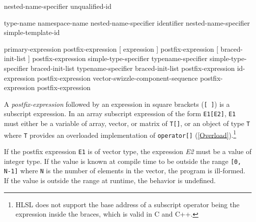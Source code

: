 
\begin{grammar}
  \br
  nested-name-specifier  unqualified-id\br

  \br
  \terminal{::}\br
  type-name \terminal{::}\br
  namespace-name \terminal{::}\br
  nested-name-specifier identifier \terminal{::}\br
  nested-name-specifier  simple-template-id \terminal{::}
\end{grammar}


\begin{grammar}
  \br
  primary-expression\br
  postfix-expression [ expression ]\br
  postfix-expression [ braced-init-list ]\br %
  postfix-expression \terminal{(}  \terminal{)}\br
  simple-type-specifier \terminal{(}  \terminal{)}\br
  typename-specifier \terminal{(}  \terminal{)}\br
  simple-type-specifier braced-init-list\br
  typename-specifier braced-init-list\br
  postfix-expression   id-expression\br
  postfix-expression  vector-swizzle-component-sequence\br
  postfix-expression \terminal{++}\br
  postfix-expression \terminal{--}
\end{grammar}


\p A \textit{postfix-expression} followed by an expression in square brackets
(\texttt{[ ]}) is a subscript expression. In an array subscript expression of
the form \texttt{E1[E2]}, \texttt{E1} must either be a variable of array,
vector, or matrix of \texttt{T[]}, or an object of type \texttt{T} where
\texttt{T} provides an overloaded implementation of \texttt{operator[]}
(\ref{Overload}).\footnote{HLSL does not support the base address of a subscript
operator being the expression inside the braces, which is valid in C and C++.}

\p If the postfix expression \texttt{E1} is of vector type, the expression
\textit{E2} must be a value of integer type. If the value is known at compile
time to be outside the range \texttt{[0, N-1]} where \texttt{N} is the number of
elements in the vector, the program is ill-formed. If the value is outside the
range at runtime, the behavior is undefined.

